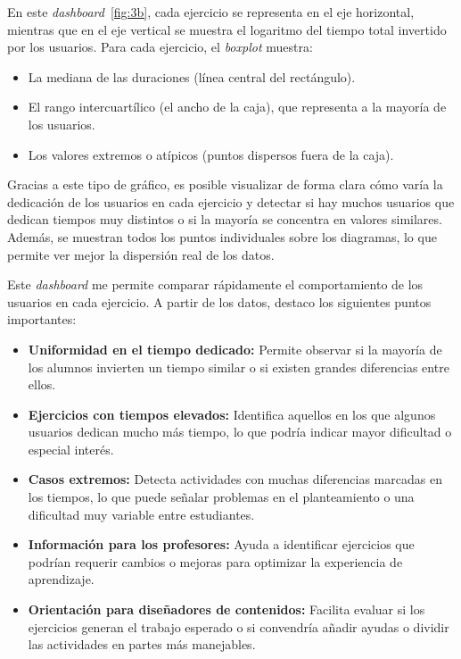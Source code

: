 \documentclass[a4paper, 12pt]{book}
\begin{document}
En este \textit{dashboard}~\ref{fig:3b}, cada ejercicio se representa en el eje horizontal, mientras que en el eje vertical se muestra el logaritmo del tiempo total invertido por los usuarios. Para cada ejercicio, el \textit{boxplot} muestra:

\begin{itemize}
  \item La mediana de las duraciones (línea central del rectángulo).
  \item El rango intercuartílico (el ancho de la caja), que representa a la mayoría de los usuarios.
  \item Los valores extremos o atípicos (puntos dispersos fuera de la caja).
\end{itemize}

Gracias a este tipo de gráfico, es posible visualizar de forma clara cómo varía la dedicación de los usuarios en cada ejercicio y detectar si hay muchos usuarios que dedican tiempos muy distintos o si la mayoría se concentra en valores similares. Además, se muestran todos los puntos individuales sobre los diagramas, lo que permite ver mejor la dispersión real de los datos.

Este \textit{dashboard} me permite comparar rápidamente el comportamiento de los usuarios en cada ejercicio. A partir de los datos, destaco los siguientes puntos importantes:

\begin{itemize}
  \item \textbf{Uniformidad en el tiempo dedicado:} Permite observar si la mayoría de los alumnos invierten un tiempo similar o si existen grandes diferencias entre ellos.

  \item \textbf{Ejercicios con tiempos elevados:} Identifica aquellos en los que algunos usuarios dedican mucho más tiempo, lo que podría indicar mayor dificultad o especial interés.

  \item \textbf{Casos extremos:} Detecta actividades con muchas diferencias marcadas en los tiempos, lo que puede señalar problemas en el planteamiento o una dificultad muy variable entre estudiantes.

  \item \textbf{Información para los profesores:} Ayuda a identificar ejercicios que podrían requerir cambios o mejoras para optimizar la experiencia de aprendizaje.

  \item \textbf{Orientación para diseñadores de contenidos:} Facilita evaluar si los ejercicios generan el trabajo esperado o si convendría añadir ayudas o dividir las actividades en partes más manejables.
\end{itemize}
\end{document}
